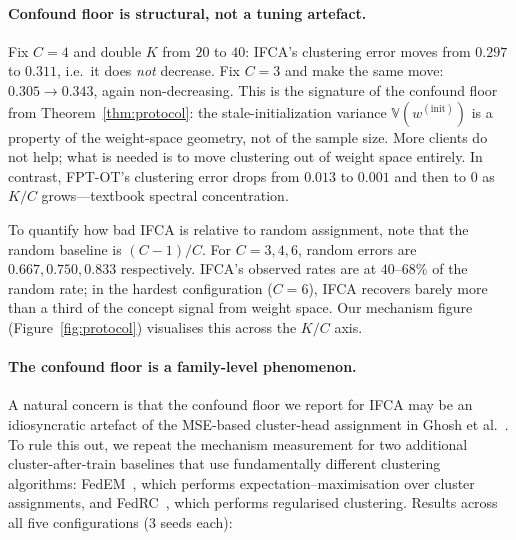 \paragraph{Confound floor is structural, not a tuning artefact.}
Fix $C = 4$ and double $K$ from $20$ to $40$: IFCA's clustering error moves from $0.297$ to $0.311$, i.e.\ it does \emph{not} decrease. Fix $C = 3$ and make the same move: $0.305 \to 0.343$, again non-decreasing. This is the signature of the confound floor from Theorem~\ref{thm:protocol}: the stale-initialization variance $\mathbb{V}(w^{(\mathrm{init})})$ is a property of the weight-space geometry, not of the sample size. More clients do not help; what is needed is to move clustering out of weight space entirely. In contrast, FPT-OT's clustering error drops from $0.013$ to $0.001$ and then to $0$ as $K/C$ grows---textbook spectral concentration.

To quantify how bad IFCA is relative to random assignment, note that the random baseline is $(C-1)/C$. For $C = 3, 4, 6$, random errors are $0.667, 0.750, 0.833$ respectively. IFCA's observed rates are at $40$--$68\%$ of the random rate; in the hardest configuration ($C = 6$), IFCA recovers barely more than a third of the concept signal from weight space. Our mechanism figure (Figure~\ref{fig:protocol}) visualises this across the $K/C$ axis.

\paragraph{The confound floor is a family-level phenomenon.}
A natural concern is that the confound floor we report for IFCA may be an idiosyncratic artefact of the MSE-based cluster-head assignment in Ghosh et al.~\citep{ghosh2020efficient}. To rule this out, we repeat the mechanism measurement for two additional cluster-after-train baselines that use fundamentally different clustering algorithms: FedEM~\citep{marfoq2021federated}, which performs expectation--maximisation over cluster assignments, and FedRC~\citep{guo2024fedrc}, which performs regularised clustering. Results across all five configurations (3 seeds each):

